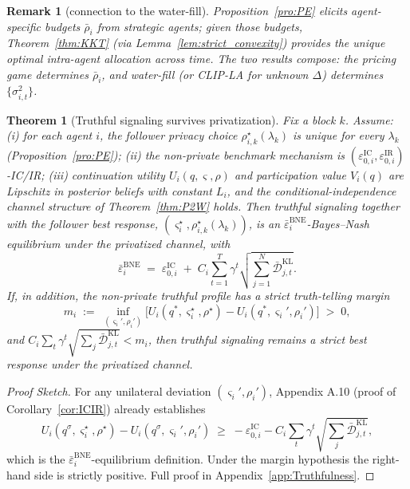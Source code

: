 \documentclass{article}
\newtheorem{theorem}{Theorem}
\newtheorem{remark}{Remark}
\begin{document}
\begin{remark}
    [connection to the water-fill]
    Proposition~\ref{pro:PE} elicits agent-specific budgets $\bar\rho_i$ from strategic agents; given those budgets, Theorem~\ref{thm:KKT} (via Lemma~\ref{lem:strict_convexity}) provides the unique optimal intra-agent allocation across time. The two results compose: the pricing game determines $\bar\rho_i$, and water-fill (or CLIP-LA for unknown $\Delta$) determines $\{\sigma_{i,t}^2\}$.
\end{remark}

\begin{theorem}
    [Truthful signaling survives privatization]
    \label{thm:Truthfulness}
    Fix a block $k$. Assume: (i) for each agent $i$, the follower privacy choice $\rho_{i,k}^\star(\lambda_k)$ is unique for every $\lambda_k$ (Proposition~\ref{pro:PE}); (ii) the non-private benchmark mechanism is $(\varepsilon_{0,i}^{\mathrm{IC}}, \varepsilon_{0,i}^{\mathrm{IR}})$-IC/IR; (iii) continuation utility $U_i(q,\varsigma,\rho)$ and participation value $V_i(q)$ are Lipschitz in posterior beliefs with constant $L_i$, and the conditional-independence channel structure of Theorem~\ref{thm:P2W} holds. Then truthful signaling together with the follower best response, $(\varsigma_i^\star, \rho_{i,k}^\star(\lambda_k))$, is an $\bar\varepsilon_i^{\mathrm{BNE}}$-Bayes–Nash equilibrium under the privatized channel, with
    $$\bar\varepsilon_i^{\mathrm{BNE}} \;=\; \varepsilon_{0,i}^{\mathrm{IC}} \;+\; C_i \sum_{t=1}^T \gamma^t \sqrt{\sum_{j=1}^N \bar{\mathcal{D}}_{j,t}^{\mathrm{KL}}}.$$
    If, in addition, the non-private truthful profile has a strict truth-telling margin
    $$m_i \;:=\; \inf_{(\varsigma_i',\rho_i')} \Big[U_i(q^*, \varsigma_i^\star, \rho^\star) - U_i(q^*, \varsigma_i', \rho_i')\Big] \;>\; 0,$$
    and $C_i \sum_{t} \gamma^t \sqrt{\sum_j \bar{\mathcal{D}}_{j,t}^{\mathrm{KL}}} < m_i$, then truthful signaling remains a strict best response under the privatized channel.
\end{theorem}

\begin{proof}
    [Proof Sketch]
    For any unilateral deviation $(\varsigma_i',\rho_i')$, Appendix A.10 (proof of Corollary~\ref{cor:ICIR}) already establishes
    $$U_i(q^\sigma,\varsigma_i^\star,\rho^\star) - U_i(q^\sigma,\varsigma_i',\rho_i') \;\ge\; -\varepsilon_{0,i}^{\mathrm{IC}} - C_i \sum_t \gamma^t \sqrt{\textstyle\sum_j \bar{\mathcal{D}}_{j,t}^{\mathrm{KL}}},$$
    which is the $\bar\varepsilon_i^{\mathrm{BNE}}$-equilibrium definition. Under the margin hypothesis the right-hand side is strictly positive. Full proof in Appendix~\ref{app:Truthfulness}.
\end{proof}
\end{document}
